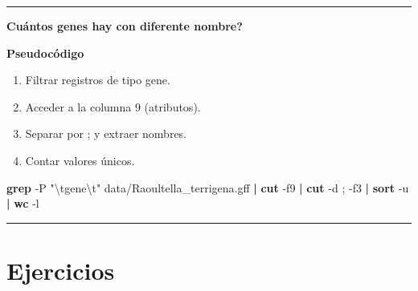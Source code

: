 \documentclass[
]{book}
\newenvironment{Shaded}{\begin{snugshade}}{\end{snugshade}}
\newcommand{\AttributeTok}[1]{\textcolor[rgb]{0.13,0.29,0.53}{#1}}
\newcommand{\FunctionTok}[1]{\textcolor[rgb]{0.13,0.29,0.53}{\textbf{#1}}}
\newcommand{\KeywordTok}[1]{\textcolor[rgb]{0.13,0.29,0.53}{\textbf{#1}}}
\newcommand{\NormalTok}[1]{#1}
\newcommand{\StringTok}[1]{\textcolor[rgb]{0.31,0.60,0.02}{#1}}
\begin{document}
\begin{center}\rule{0.5\linewidth}{0.5pt}\end{center}

\textbf{Cuántos genes hay con diferente nombre?}

\textbf{Pseudocódigo}

\begin{enumerate}
\def\labelenumi{\arabic{enumi}.}
\item
  Filtrar registros de tipo gene.
\item
  Acceder a la columna 9 (atributos).
\item
  Separar por ; y extraer nombres.
\item
  Contar valores únicos.
\end{enumerate}

\begin{Shaded}
\begin{Highlighting}[]
\FunctionTok{grep} \AttributeTok{{-}P} \StringTok{"\textbackslash{}tgene\textbackslash{}t"}\NormalTok{ data/Raoultella\_terrigena.gff }\KeywordTok{|} \FunctionTok{cut} \AttributeTok{{-}f9} \KeywordTok{|} \FunctionTok{cut} \AttributeTok{{-}d} \StringTok{\textquotesingle{};\textquotesingle{}} \AttributeTok{{-}f3} \KeywordTok{|} \FunctionTok{sort} \AttributeTok{{-}u} \KeywordTok{|} \FunctionTok{wc} \AttributeTok{{-}l}
\end{Highlighting}
\end{Shaded}

\begin{center}\rule{0.5\linewidth}{0.5pt}\end{center}

\section{Ejercicios}\label{ejercicios}
\end{document}
